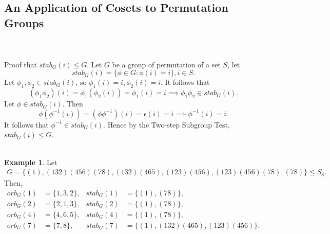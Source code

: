 \documentclass{article}
\theoremstyle{definition}
\newtheorem{definition}{Definition}[section]
\newtheorem{example}{Example}[section]
\begin{document}
     \subsection{An Application of Cosets to Permutation Groups}
     \\ \\
     Proof that $stab_G(i) \leq G$. Let $G$ be a group of permutation of a set $S$, let
     \begin{equation*}
         stab_G(i) = \{\phi \in G: \phi(i) = i\}, i \in S.
     \end{equation*}
     Let $\phi_1,\phi_2 \in stab_G(i)$, so $\phi_1(i)=i,\phi_2(i)=i$. It follows that
     \begin{equation*}
         (\phi_1\phi_2)(i) = \phi_1(\phi_2(i)) = \phi_1(i) = i \implies \phi_1\phi_2 \in stab_G(i).
     \end{equation*}
     Let $\phi \in stab_G(i)$. Then
     \begin{equation*}
         \phi(\phi^{-1}(i)) = (\phi\phi^{-1})(i) = \epsilon(i) = i \implies \phi^{-1}(i) = i.
     \end{equation*}
     It follows that $\phi^{-1} \in stab_G(i)$. Hence by the Two-step Subgroup Test, $stab_G(i) \leq G$.
     \\ \\
     
     \begin{example}
         Let
         \begin{align*}
             G = \{(1),(132)(456)(78),(132)(465),(123)(456),(123)(456)(78),(78)\} \leq S_8.
         \end{align*}
         Then,
         \begin{align*}
             orb_G(1) &= \{1,3,2\}, & stab_G(1) &= \{(1),(78)\}, \\
             orb_G(2) &= \{2,1,3\}, & stab_G(2) &= \{(1),(78)\}, \\
             orb_G(4) &= \{4,6,5\}, & stab_G(4) &= \{(1),(78)\}, \\
             orb_G(7) &= \{7,8\}, & stab_G(7) &= \{(1),(132)(465),(123)(456)\}.
         \end{align*}
     \end{example}
     
\end{document}
